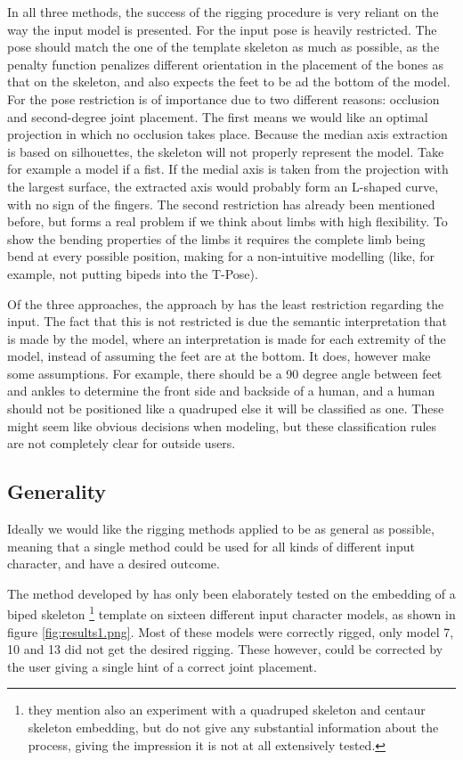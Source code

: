 \documentclass{article}
\begin{document}
In all three methods, the success of the rigging procedure is very reliant on
the way the input model is presented. For \citep{paper1} the input pose is
heavily restricted. The pose should match the one of the template skeleton as
much as possible, as the penalty function penalizes different orientation in the
placement of the bones as that on the skeleton, and also expects the feet to be
ad the bottom of the model.
For \citep{paper2} the pose restriction is of importance due to two different
reasons: occlusion and second-degree joint placement. The first means we would
like an optimal projection in which no occlusion takes place. Because the median
axis extraction is based on silhouettes, the skeleton will not properly
represent the model. Take for example a model if a fist. If the medial axis is
taken from the projection with the largest surface, the extracted axis would
probably form an L-shaped curve, with no sign of the fingers.
The second restriction has already been mentioned before, but forms a real problem if we
think about limbs with high flexibility. To show the bending properties of the limbs it requires
the complete limb being bend at every possible position, making for a
non-intuitive modelling (like, for example, not putting bipeds into the T-Pose).

Of the three approaches, the approach by \citep{paper3} has the least
restriction regarding the input. The fact that this
is not restricted is due the semantic interpretation that is made by the model,
where an interpretation is made for each extremity of the model, instead of
assuming the feet are at the bottom. It does, however make some assumptions.
For example, there should be a 90 degree angle between feet and ankles to
determine the front side and backside of a human, and a human should not be
positioned like a quadruped else it will be classified as one.
These might seem like obvious decisions when modeling, but these
classification rules are not completely clear for outside users.

\subsection{Generality}
Ideally we would like the rigging methods applied to be as general as possible,
meaning that a single method could be used for all kinds of different input
character, and have a desired outcome.

The method developed by \citep{paper1} has only been elaborately tested on the
embedding of a biped skeleton \footnote{they mention also an experiment with a quadruped
skeleton and centaur skeleton embedding, but do not give any substantial information
about the process, giving the impression it is not at all extensively tested.}
template on sixteen different input character models, as shown in figure
\ref{fig:results1.png}. Most of these models were
correctly rigged, only model 7, 10 and 13 did not get the desired rigging. These
however, could be corrected by the user giving a single hint of a correct joint
placement.
\end{document}
